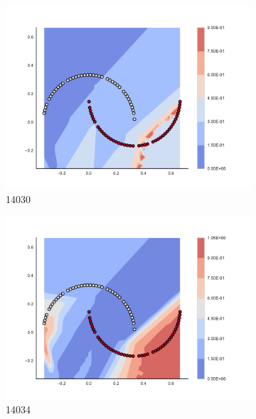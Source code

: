 \begin{figure}[h]
\begin{subfigure}[b]{0.09\textwidth}
    \includegraphics[clip, trim=2.35cm 1.75cm 4.5cm 0cm,width=\textwidth]{img/convergence/14030.pdf}
    \caption{14030}
    \label{fig:convergence_14030}
\end{subfigure}
%
\begin{subfigure}[b]{0.09\textwidth}
    \includegraphics[clip, trim=2.35cm 1.75cm 4.5cm 0cm,width=\textwidth]{img/convergence/14034.pdf}
    \caption{14034}
    \label{fig:convergence_14034}
\end{subfigure}
%
\begin{subfigure}[b]{0.09\textwidth}

\end{subfigure}
\end{figure}
